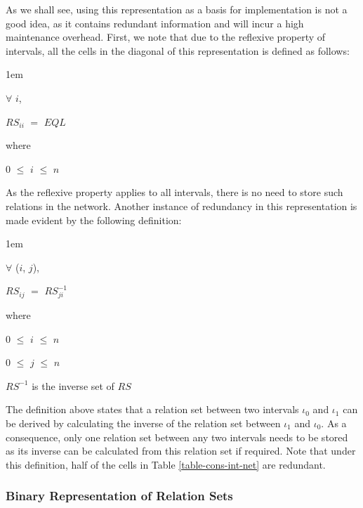 \documentclass[11pt]{report}
\newenvironment{vquote}
{
  \begin{list}{}{\leftmargin 1em}\item[]
}
{
  \end{list}
}
\begin{document}
        As we shall see, using this representation as a basis for
        implementation is not a good idea, as it contains redundant information
        and will incur a high maintenance overhead. First, we note that due
        to the reflexive property of intervals, all the cells in the diagonal
        of this representation is defined as follows:

        \begin{vquote}
          $\forall$ $i$,

          $RS_{ii}$ $=$ {$EQL$}

          where

          \hspace{1em}
          $0$ $\leq$ $i$ $\leq$ $n$
        \end{vquote}

        As the reflexive property applies to all intervals, there is no need to
        store such relations in the network. Another instance of redundancy in
        this representation is made evident by the following definition:

        \begin{vquote}
          $\forall$ ($i$, $j$),

          $RS_{ij}$ $=$ $RS^{-1}_{ji}$

          where

          \hspace{1em}
          $0$ $\leq$ $i$ $\leq$ $n$

          \hspace{1em}
          $0$ $\leq$ $j$ $\leq$ $n$

          \hspace{1em}
          $RS^{-1}$ is the inverse set of $RS$
        \end{vquote}

        The definition above states that a relation set between two intervals
        $\iota_0$ and $\iota_1$ can be derived by calculating the inverse of
        the relation set between $\iota_1$ and $\iota_0$. As a consequence,
        only one relation set between any two intervals needs to be stored
        as its inverse can be calculated from this relation set if required.
        Note that under this definition, half of the cells in Table
        \ref{table-cons-int-net} are redundant.

        \subsubsection{Binary Representation of Relation Sets}
\end{document}
